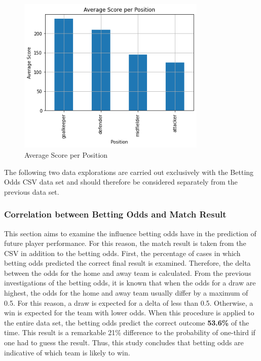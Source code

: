 \begin{figure}[H]
    \centering
    \includegraphics[width=9cm]{chapter/4_implementation/section/2_data/section/figures/average_score_per_position.png}
    \captionsetup{justification=centering}
    \caption{Average Score per Position}
    \label{fig:average_score_per_position}
\end{figure}

The following two data explorations are carried out exclusively with the Betting Odds CSV data set \parencite[see][]{football-data_germany_2021} and should therefore be considered separately from the previous data set.

\subsubsection{Correlation between Betting Odds and Match Result}

This section aims to examine the influence betting odds have in the prediction of future player performance. For this reason, the match result is taken from the CSV in addition to the betting odds. First, the percentage of cases in which betting odds predicted the correct final result is examined. Therefore, the delta between the odds for the home and away team is calculated. From the previous investigations of the betting odds, it is known that when the odds for a draw are highest, the odds for the home and away team usually differ by a maximum of 0.5. For this reason, a draw is expected for a delta of less than 0.5. Otherwise, a win is expected for the team with lower odds. When this procedure is applied to the entire data set, the betting odds predict the correct outcome \textbf{53.6\%} of the time. This result is a remarkable 21\% difference to the probability of one-third if one had to guess the result. Thus, this study concludes that betting odds are indicative of which team is likely to win. 


